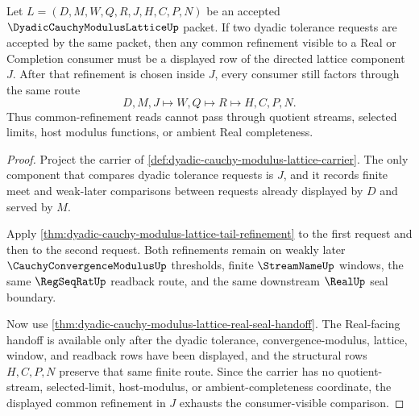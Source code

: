 \begin{theorem}
\label{thm:dyadic-cauchy-modulus-lattice-common-refinement-exhaustion}
Let $L=(D,M,W,Q,R,J,H,C,P,N)$ be an accepted $\DyadicCauchyModulusLatticeUp$ packet. If two dyadic tolerance requests are accepted by the same packet, then any common refinement visible to a Real or Completion consumer must be a displayed row of the directed lattice component $J$. After that refinement is chosen inside $J$, every consumer still factors through the same route
$$
D,M,J \longmapsto W,Q \longmapsto R \longmapsto H,C,P,N .
$$
Thus common-refinement reads cannot pass through quotient streams, selected limits, host modulus functions, or ambient Real completeness.
\end{theorem}
\begin{proof}
Project the carrier of \autoref{def:dyadic-cauchy-modulus-lattice-carrier}. The only component that compares dyadic tolerance requests is $J$, and it records finite meet and weak-later comparisons between requests already displayed by $D$ and served by $M$.

Apply \autoref{thm:dyadic-cauchy-modulus-lattice-tail-refinement} to the first request and then to the second request. Both refinements remain on weakly later $\CauchyConvergenceModulusUp$ thresholds, finite $\StreamNameUp$ windows, the same $\RegSeqRatUp$ readback route, and the same downstream $\RealUp$ seal boundary.

Now use \autoref{thm:dyadic-cauchy-modulus-lattice-real-seal-handoff}. The Real-facing handoff is available only after the dyadic tolerance, convergence-modulus, lattice, window, and readback rows have been displayed, and the structural rows $H,C,P,N$ preserve that same finite route. Since the carrier has no quotient-stream, selected-limit, host-modulus, or ambient-completeness coordinate, the displayed common refinement in $J$ exhausts the consumer-visible comparison.
\end{proof}


